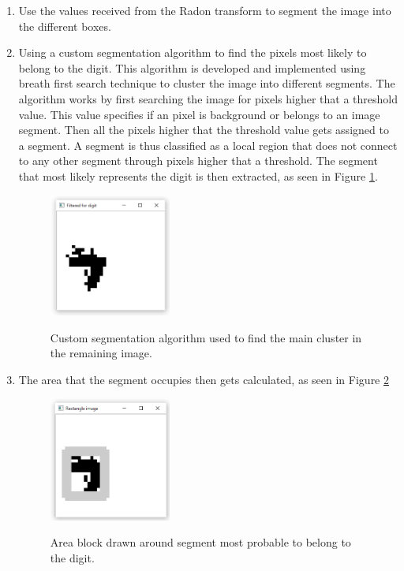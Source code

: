 \begin{enumerate}
\item Use the values received from the Radon transform to segment the image into the different boxes.
\item Using a custom segmentation algorithm to find the pixels most likely to belong to the digit. This algorithm is developed and implemented using breath first search technique to cluster the image into different segments. The algorithm works by first searching the image for pixels higher that a threshold value. This value specifies if an pixel is background or belongs to an image segment. Then all the pixels higher that the threshold value gets assigned to a segment. A segment is thus classified as a local region that does not connect to any other segment through pixels higher that a threshold. The segment that most likely represents the digit is then extracted, as seen in Figure \ref{fig:c}.
\begin{figure}
  \centering
  \includegraphics[width=4cm]{Cluster}\\
  \caption{Custom segmentation algorithm used to find the main cluster in the remaining image.}
  \label{fig:c}
\end{figure}

\item The area that the segment occupies then gets calculated, as seen in Figure \ref{fig:areaLoc}

\begin{figure}
  \centering
  \includegraphics[width=4cm]{DetectArea}\\
  \caption{Area block drawn around segment most probable to belong to the digit.}
  \label{fig:areaLoc}
\end{figure}


\end{enumerate}
